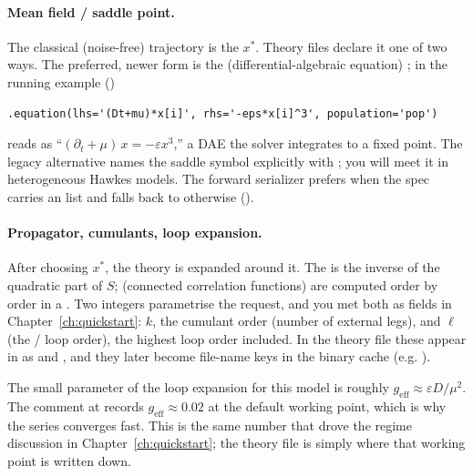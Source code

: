 \paragraph{Mean field / saddle point.} The classical (noise-free) trajectory is
the  $x^{*}$. Theory files declare it one of two ways.
The preferred, newer form is the  (differential-algebraic equation)
; in the running example
()

\begin{lstlisting}
.equation(lhs='(Dt+mu)*x[i]', rhs='-eps*x[i]^3', population='pop')
\end{lstlisting}

reads as ``$(\partial_t + \mu)\,x = -\varepsilon x^{3}$,'' a DAE the solver
integrates to a fixed point. The legacy alternative names the saddle symbol
explicitly with ; you will meet it in
heterogeneous Hawkes models. The forward serializer prefers 
when the spec carries an  list and falls back to
 otherwise
().

\paragraph{Propagator, cumulants, loop expansion.} After choosing $x^{*}$, the
theory is expanded around it. The  is the inverse of the
quadratic part of $S$;  (connected correlation functions) are
computed order by order in a . Two integers parametrise the
request, and you met both as  fields in Chapter~\ref{ch:quickstart}:
$k$, the cumulant order (number of external legs), and $\ell$ (the
 / loop order), the highest loop order included. In the theory
file these appear in  as  and ,
and they later become file-name keys in the binary cache (e.g.
).

\begin{note}
The small parameter of the loop expansion for this model is roughly
$g_{\mathrm{eff}} \approx \varepsilon D / \mu^{2}$. The comment at
 records $g_{\mathrm{eff}} \approx 0.02$
at the default working point, which is why the series converges fast. This is the
same number that drove the regime discussion in Chapter~\ref{ch:quickstart}; the
theory file is simply where that working point is written down.
\end{note}

